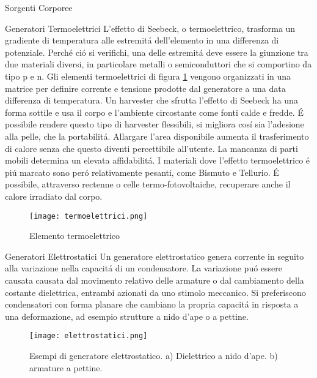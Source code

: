 \begin{section}{Sorgenti Corporee}
   \begin{subsection}{Generatori Termoelettrici}
    L'effetto di Seebeck, o termoelettrico, trasforma un gradiente di temperatura alle estremit\'a dell'elemento in una differenza di potenziale. Perch\'e ci\'o si verifichi, una delle estremit\'a deve essere la giunzione tra due materiali diversi, in particolare metalli o semiconduttori che si comportino da tipo p e n. Gli elementi termoelettrici di figura \ref{fig:termoelettrici} vengono organizzati in una matrice per definire corrente e tensione prodotte dal generatore a una data differenza di temperatura. Un harvester che sfrutta l'effetto di Seebeck ha una forma sottile e usa il corpo e l'ambiente circostante come fonti calde e fredde. \'E possibile rendere questo tipo di harvester flessibili, si migliora cos\'i sia l'adesione alla pelle, che la portabilit\'a. Allargare l'area disponibile aumenta il trasferimento di calore senza che questo diventi percettibile all'utente. La mancanza di parti mobili determina un elevata affidabilit\'a. I materiali dove l'effetto termoelettrico \'e pi\'u marcato sono per\'o relativamente pesanti, come Bismuto e Tellurio. \'E possibile, attraverso rectenne o celle termo-fotovoltaiche, recuperare anche il calore irradiato dal corpo.
    \begin{figure}[H]
        \texttt{[image: termoelettrici.png]}
        \centering
        \caption{Elemento termoelettrico}
        \label{fig:termoelettrici}
    \end{figure}
   \end{subsection}

   \begin{subsection}{Generatori Elettrostatici}
    Un generatore elettrostatico genera corrente in seguito alla variazione nella capacit\'a di un condensatore. La variazione pu\'o essere causata causata dal movimento relativo delle armature o dal cambiamento della costante dielettrica, entrambi azionati da uno stimolo meccanico. Si preferiscono condensatori con forma planare che cambiano la propria capacit\'a in risposta a una deformazione, ad esempio strutture a nido d'ape o a pettine.
    \begin{figure}[H]
        \texttt{[image: elettrostatici.png]}
        \centering
        \caption{Esempi di generatore elettrostatico. a) Dielettrico a nido d'ape. b) armature a pettine.}
        \label{fig:elettristatici}
    \end{figure}
   \end{subsection}


\end{section}
